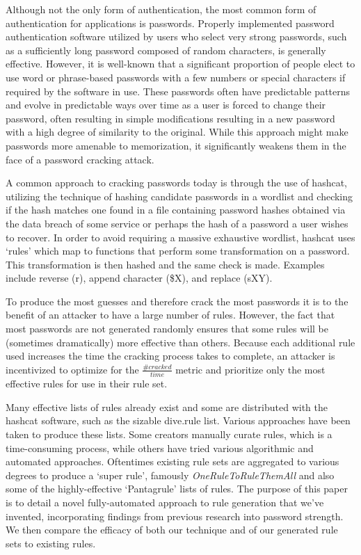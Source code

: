\documentclass[letterpaper,twocolumn,10pt]{article}
\begin{document}
Although not the only form of authentication, the most common form of authentication for
applications is passwords. Properly implemented password authentication software utilized
by users who select very strong passwords, such as a sufficiently long password composed
of random characters, is generally effective. However, it is well-known that a significant
proportion of people elect to use word or phrase-based passwords with a few numbers or
special characters if required by the software in use. These passwords often have predictable
patterns and evolve in predictable ways over time as a user is forced to change their
password, often resulting in simple modifications resulting in a new password with a high
degree of similarity to the original.\cite{hanamsagar2018leveraging} While this approach
might make passwords more amenable to memorization, it significantly weakens them in the
face of a password cracking attack.

A common approach to cracking passwords today is through the use of
hashcat, utilizing the technique of hashing candidate passwords in a wordlist and checking
if the hash matches one found in a file containing password hashes obtained via the
data breach of some service or perhaps the hash of a password a user wishes to recover.
In order to avoid requiring a massive exhaustive wordlist,
hashcat uses `rules' which map to functions that perform some transformation on a password.
This transformation is then hashed and the same check is made. Examples include reverse (r),
append character (\$X), and replace (sXY).\cite{hashcat}


To produce the most guesses and therefore crack the most passwords it is to the benefit of
an attacker to have a large number of rules. However, the fact that most passwords are
not generated randomly ensures that some rules will be (sometimes dramatically) more effective
than others. Because each additional rule used increases the time the cracking process takes
to complete, an attacker is incentivized to optimize for the $\frac{\# cracked}{time}$ metric
and prioritize only the most effective rules for use in their rule set.


Many effective lists of rules already exist and some are distributed with the
hashcat software, such as the sizable dive.rule list. Various approaches have been
taken to produce these lists. Some creators manually curate rules, which is a 
time-consuming process, while others have tried various algorithmic and automated approaches.
Oftentimes existing rule sets are aggregated to various degrees to produce a `super rule',
famously \textit{OneRuleToRuleThemAll} and also some of the highly-effective `Pantagrule' lists of rules.\cite{ortrta}\cite{pantagrule}
The purpose of this paper is to detail a novel fully-automated approach to rule generation that
we've invented, incorporating findings from previous research into password strength. We then
compare the efficacy of both our technique and of our generated rule sets to existing rules.
\end{document}
